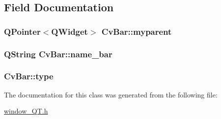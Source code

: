 \subsection{Field Documentation}
\hypertarget{classCvBar_af6fa35b8c9f4aed557854fc3aa80a040}{
\subsubsection[{myparent}]{\setlength{\rightskip}{0pt plus 5cm}Q\-Pointer$<$Q\-Widget$>$ Cv\-Bar\-::myparent}}\label{classCvBar_af6fa35b8c9f4aed557854fc3aa80a040}
\hypertarget{classCvBar_a6970f0eae76786143e2df415681d0a6f}{
\subsubsection[{name\-\_\-bar}]{\setlength{\rightskip}{0pt plus 5cm}Q\-String Cv\-Bar\-::name\-\_\-bar}}\label{classCvBar_a6970f0eae76786143e2df415681d0a6f}
\hypertarget{classCvBar_a64329aa3255c2c98a36f3f887a939b40}{
\subsubsection[{type}]{ Cv\-Bar\-::type}}\label{classCvBar_a64329aa3255c2c98a36f3f887a939b40}


The documentation for this class was generated from the following file\-:\begin{DoxyCompactItemize}
\item 
\hyperlink{window__QT_8h}{window\-\_\-\-Q\-T.\-h}\end{DoxyCompactItemize}
